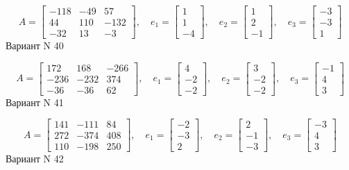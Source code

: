 \documentclass[11pt]{report}
\begin{document}
$$A = \left[\begin{matrix}-118 & -49 & 57\\44 & 110 & -132\\-32 & 13 & -3\end{matrix}\right],\quad e_1 = \left[\begin{matrix}1\\1\\-4\end{matrix}\right],\quad e_2 = \left[\begin{matrix}1\\2\\-1\end{matrix}\right],\quad e_3 = \left[\begin{matrix}-3\\-3\\1\end{matrix}\right]$$Вариант N 40

$$A = \left[\begin{matrix}172 & 168 & -266\\-236 & -232 & 374\\-36 & -36 & 62\end{matrix}\right],\quad e_1 = \left[\begin{matrix}4\\-2\\-2\end{matrix}\right],\quad e_2 = \left[\begin{matrix}3\\-2\\-2\end{matrix}\right],\quad e_3 = \left[\begin{matrix}-1\\4\\3\end{matrix}\right]$$Вариант N 41

$$A = \left[\begin{matrix}141 & -111 & 84\\272 & -374 & 408\\110 & -198 & 250\end{matrix}\right],\quad e_1 = \left[\begin{matrix}-2\\-3\\2\end{matrix}\right],\quad e_2 = \left[\begin{matrix}2\\-1\\-3\end{matrix}\right],\quad e_3 = \left[\begin{matrix}-3\\4\\3\end{matrix}\right]$$Вариант N 42
\end{document}
